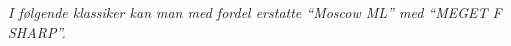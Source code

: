 \documentclass[10pt,a5paper,final,]{memoir}%
\begin{document}

\newpage

\newpage

\newpage
\emph{I følgende klassiker kan man med fordel erstatte ``Moscow ML'' med ``MEGET
  F SHARP''.}
\vspace{-5mm}

\newpage

\newpage

\newpage

\newpage

\end{document}
